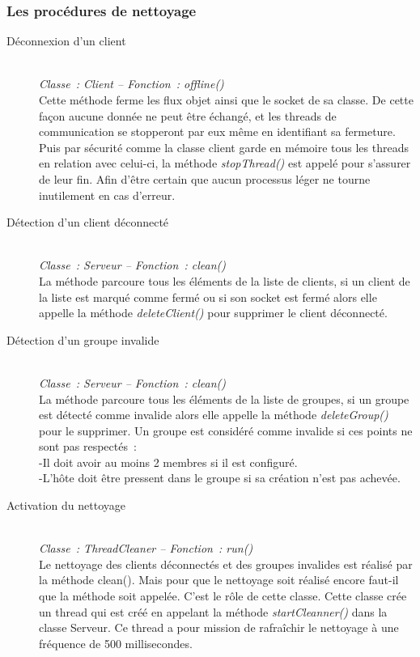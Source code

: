 \documentclass[a4paper, titlepage]{livret}
\begin{document}
\subsubsection{Les procédures de nettoyage}
\begin{description}
  \item[Déconnexion d’un client]
  \textit{\\Classe : Client – Fonction : offline()\\}
Cette méthode ferme les flux objet ainsi que le socket de sa classe. De cette façon aucune donnée ne peut être échangé, et les threads de communication se stopperont par eux même en identifiant sa fermeture.
Puis par sécurité comme la classe client garde en mémoire tous les threads en relation avec celui-ci, la méthode \textit{stopThread()} est appelé pour s’assurer de leur fin. Afin d’être certain que aucun processus léger ne tourne inutilement en cas d’erreur.
  
  \item[Détection d’un client déconnecté]
  \textit{\\Classe : Serveur – Fonction : clean()\\}
  La méthode parcoure tous les éléments de la liste de clients, si un client de la liste est marqué comme fermé ou si son socket est fermé alors elle appelle la méthode \textit{deleteClient()} pour supprimer le client déconnecté.
  
  \item[Détection d’un groupe invalide]
  \textit{\\Classe : Serveur – Fonction : clean()\\}
  La méthode parcoure tous les éléments de la liste de groupes, si un groupe est détecté comme invalide alors elle appelle la méthode \textit{deleteGroup()} pour le supprimer.
Un groupe est considéré comme invalide si ces points ne sont pas respectés :\\
-Il doit avoir au moins 2 membres si il est configuré.\\
-L’hôte doit être pressent dans le groupe si sa création n’est pas achevée.

  \item[Activation du nettoyage]
  \textit{\\Classe : ThreadCleaner – Fonction : run()\\}
  Le nettoyage des clients déconnectés et des groupes invalides est réalisé par la méthode clean(). Mais pour que le nettoyage soit réalisé encore faut-il que la méthode soit appelée. C’est le rôle de cette classe. Cette classe crée un thread qui est créé en appelant la méthode \textit{startCleanner()} dans la classe Serveur. Ce thread a pour mission de rafraîchir le nettoyage à une fréquence de 500 millisecondes.
  
  \end{description}
  
\end{document}
